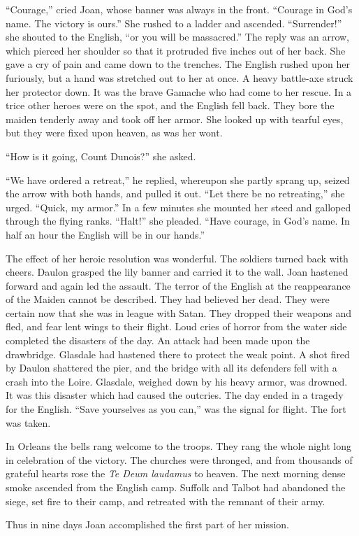 ``Courage,'' cried Joan, whose banner was always in the front. ``Courage
in God's name. The victory is ours.'' She rushed to a ladder and
ascended. ``Surrender!'' she shouted to the English, ``or you will be
massacred.'' The reply was an arrow, which pierced her shoulder so that
it protruded five inches out of her back. She gave a cry of pain and
came down to the trenches. The English rushed upon her furiously, but a
hand was stretched out to her at once. A heavy battle-axe struck her
protector down. It was the brave Gamache who had come to her rescue. In
a trice other heroes were on the spot, and the English fell back. They
bore the maiden tenderly away and took off her armor. She looked up with
tearful eyes, but they were fixed upon heaven, as was her wont.

``How is it going, Count Dunois?'' she asked.

``We have ordered a retreat,'' he replied, whereupon she partly sprang
up, seized the arrow with both hands, and pulled it out. ``Let there be
no retreating,'' she urged. ``Quick, my armor.'' In a few minutes she
mounted her steed and galloped through the flying ranks. ``Halt!'' she
pleaded. ``Have courage, in God's name. In half an hour the English will
be in our hands.''

The effect of her heroic resolution was wonderful. The soldiers turned
back with cheers. Daulon grasped the lily banner and carried it to the
wall. Joan hastened forward and again led the assault. The terror of the
English at the reappearance of the Maiden cannot be described. They had
believed her dead. They were certain now that she was in league with
Satan. They dropped their weapons and fled, and fear lent wings to their
flight. Loud cries of horror from the water side completed the disasters
of the day. An attack had been made upon the drawbridge. Glasdale had
hastened there to protect the weak point. A shot fired by Daulon
shattered the pier, and the bridge with all its defenders fell with a
crash into the Loire. Glasdale, weighed down by his heavy armor, was
drowned. It was this disaster which had caused the outcries. The day
ended in a tragedy for the English. ``Save yourselves as you can,'' was
the signal for flight. The fort was taken.

In Orleans the bells rang welcome to the troops. They rang the whole
night long in celebration of the victory. The churches were thronged,
and from thousands of grateful hearts rose the \emph{Te Deum laudamus}
to heaven. The next morning dense smoke ascended from the English camp.
Suffolk and Talbot had abandoned the siege, set fire to their camp, and
retreated with the remnant of their army.

Thus in nine days Joan accomplished the first part of her mission.

\threeast
